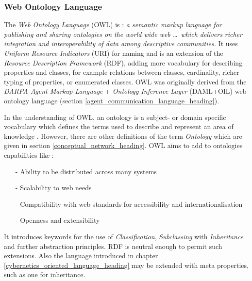%
%
%
%
%
%
%

\subsubsection{Web Ontology Language}
\label{web_ontology_language_heading}

The \emph{Web Ontology Language} (OWL) is \cite{owl}: \textit{a semantic markup
language for publishing and sharing ontologies on the world wide web \ldots\
which delivers richer integration and interoperability of data among descriptive
communities.} It uses \emph{Uniform Resource Indicators} (URI) for naming and
is an extension of the \emph{Resource Description Framework} (RDF), adding more
vocabulary for describing properties and classes, for example relations between
classes, cardinality, richer typing of properties, or enumerated classes. OWL
was originally derived from the \emph{DARPA Agent Markup Language} +
\emph{Ontology Inference Layer} (DAML+OIL) web ontology language (section
\ref{agent_communication_language_heading}).

In the understanding of OWL, an ontology is a subject- or domain specific
vocabulary which defines the terms used to describe and represent an area of
knowledge \cite{rdfowlrelease}. However, there are other definitions of the term
\emph{Ontology} which are given in section \ref{conceptual_network_heading}.
OWL aims to add to ontologies capabilities like \cite{rdfowlrelease}:

\begin{itemize}
    \item[-] Ability to be distributed across many systems
    \item[-] Scalability to web needs
    \item[-] Compatibility with web standards for accessibility and internationalisation
    \item[-] Openness and extensibility
\end{itemize}

It introduces keywords for the use of \emph{Classification}, \emph{Subclassing}
with \emph{Inheritance} and further abstraction principles. RDF is neutral
enough to permit such extensions. Also the language introduced in chapter
\ref{cybernetics_oriented_language_heading} may be extended with meta
properties, such as one for inheritance.
